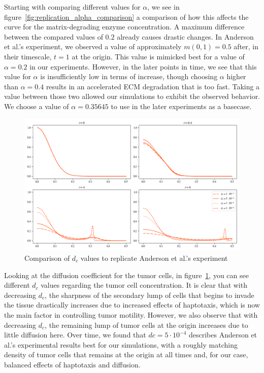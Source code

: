 Starting with comparing different values for $\alpha$, we see in figure~\ref{fig:replication_alpha_comparison} a comparison of how this affects the curve for the matrix-degrading enzyme concentration. A maximum difference between the compared values of $0.2$ already causes drastic changes. In Anderson et al.'s experiment, we observed a value of approximately $m(0,1)=0.5$ after, in their timescale, $t=1$ at the origin. This value is mimicked best for a value of $\alpha=0.2$ in our experiments. However, in the later points in time, we see that this value for $\alpha$ is insufficiently low in terms of increase, though choosing $\alpha$ higher than $\alpha=0.4$ results in an accelerated ECM degradation that is too fast. Taking a value between those two allowed our simulations to exhibit the observed behavior. We choose a value of $\alpha=0.35645$ to use in the later experiments as a basecase.

\begin{figure}[!htb]
 \centering
 \includegraphics[width=\textwidth]{resources/images/dc_comparison.png}
 \caption{Comparison of $d_c$ values to replicate Anderson et al.'s experiment}
 \label{fig:replication_dc_comparison}
\end{figure}

Looking at the diffusion coefficient for the tumor cells, in figure~\ref{fig:replication_dc_comparison}, you can see different $d_c$ values regarding the tumor cell concentration. It is clear that with decreasing $d_c$, the sharpness of the secondary lump of cells that begins to invade the tissue drastically increases due to increased effects of haptotaxis, which is now the main factor in controlling tumor motility. However, we also observe that with decreasing $d_c$, the remaining lump of tumor cells at the origin increases due to little diffusion here. Over time, we found that $dc=5 \cdot 10^{-4}$ describes Anderson et al.'s experimental results best for our simulations, with a roughly matching density of tumor cells that remains at the origin at all times and, for our case, balanced effects of haptotaxis and diffusion.

